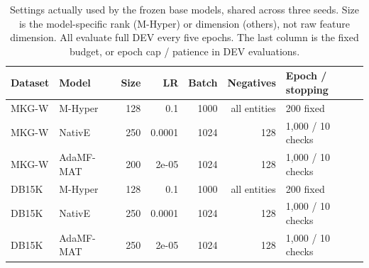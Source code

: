 \begin{table}[tbp]
\centering\footnotesize
\caption{Settings actually used by the frozen base models, shared across three seeds. Size is the model-specific rank (M-Hyper) or dimension (others), not raw feature dimension. All evaluate full DEV every five epochs. The last column is the fixed budget, or epoch cap / patience in DEV evaluations.}
\label{tab:data-training}
\begin{tabular}{llrrrrl}
\toprule
Dataset & Model & Size & LR & Batch & Negatives & Epoch / stopping\\
\midrule
MKG-W & M-Hyper & 128 & 0.1 & 1000 & all entities & 200 fixed\\
MKG-W & NativE & 250 & 0.0001 & 1024 & 128 & 1,000 / 10 checks\\
MKG-W & AdaMF-MAT & 200 & 2e-05 & 1024 & 128 & 1,000 / 10 checks\\
DB15K & M-Hyper & 128 & 0.1 & 1000 & all entities & 200 fixed\\
DB15K & NativE & 250 & 0.0001 & 1024 & 128 & 1,000 / 10 checks\\
DB15K & AdaMF-MAT & 250 & 2e-05 & 1024 & 128 & 1,000 / 10 checks\\
\bottomrule
\end{tabular}
\end{table}
